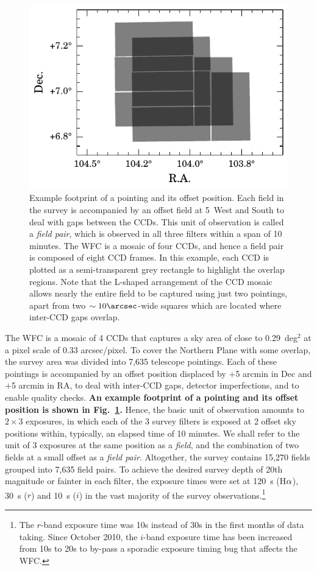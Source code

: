 \documentclass[a4paper,useAMS,usenatbib]{mn2e}
\def\ha{\mbox{H$\rm \alpha$}}
\begin{document}
\begin{figure}
    \includegraphics[width=\linewidth]{figures/fieldpair/fieldpair.pdf} 
    \caption{
    Example footprint of a pointing and its offset position.
    Each field in the survey is accompanied by an offset field
    at 5\arcmin\ West and South
	to deal with gaps between the CCDs.
	This unit of observation is called a \emph{field pair},
	which is observed in all three filters within a span of 10 minutes.
	The WFC is a mosaic of four CCDs,
	and hence a field pair is composed of eight CCD frames.
	In this example, each CCD is plotted as a semi-transparent grey rectangle
	to highlight the overlap regions.
	Note that the L-shaped arrangement of the CCD mosaic allows
	nearly the entire field to be captured using just two pointings,
	apart from two $\sim10\arcsec$-wide squares
	which are located where inter-CCD gaps overlap.	
	}
    \label{fig:fieldpair}
\end{figure}

The WFC is a mosaic of 4 CCDs 
that captures a sky area of close to 0.29~deg$^2$ at a pixel scale of
0.33 arcsec/pixel.
To cover the Northern Plane with some overlap,
the survey area was divided into 7,635 telescope pointings.
Each of these pointings is accompanied by an offset position
displaced by $+$5 arcmin in Dec 
and $+$5 arcmin in RA,
to deal with inter-CCD gaps, detector imperfections,
and to enable quality checks.
{ \bf An example footprint of a pointing
and its offset position is shown in Fig.~\ref{fig:fieldpair}.}
Hence, the basic unit of observation
amounts to $2 \times 3$ exposures, 
in which each of the 3 survey filters is exposed at 2 offset sky positions 
within, typically, an elapsed time of 10 minutes.
We shall refer to the unit of 3 exposures at the same position 
as a \emph{field},
and the combination of two fields at a small offset as a \emph{field pair}.
Altogether, the survey contains 15,270 fields
grouped into 7,635 field pairs.
To achieve the desired survey depth
of 20th magnitude or fainter in each filter, 
the exposure times were set at 120~s (\ha), 
30~s ($r$) and 10~s ($i$)
in the vast majority of the survey observations.\footnote{The $r$-band exposure time was 10s instead of 30s in the first months of data taking. Since October 2010, the $i$-band exposure time 
has been increased from 10s to 20s to by-pass a sporadic exposure timing bug that affects the WFC.}
\end{document}
